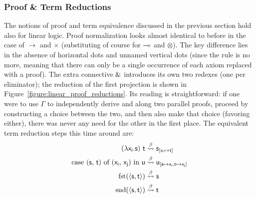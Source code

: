 \subsubsection{Proof \& Term Reductions}
The notions of proof and term equivalence discussed in the previous section hold also for linear logic.
Proof normalization looks almost identical to before in the case of $\to$ and $\times$ (substituting of course for $\li$ and $\otimes$).
The key difference lies in the absence of horizontal dots and unnamed vertical dots (since the \Contraction{} rule is no more, meaning that there can only be a single occurrence of each axiom replaced with a proof).
The extra connective ${\&}$ introduces its own two redexes (one per eliminator); the reduction of the first projection is shown in Figure~\ref{figure:linear_proof_reductions}. 
Its reading is straightforward: if one were to use $\Gamma$ to independently derive  and  along two parallel proofs, proceed by constructing a choice between the two, and then also make that choice (favoring either), there was never any need for the other in the first place.
The equivalent term reduction steps this time around are:
\begin{align*}
(\mathsf{\lambda x_i.s})~\mathsf{t} & \overset{\beta}{\leadsto} \mathsf{s}_{[\mathsf{x_i} \mapsto \mathsf{t}]}\\
\textrm{case (\ensuremath{\mathsf{s}}, \ensuremath{\mathsf{t}}) of (\ensuremath{\mathsf{x_i}}, \ensuremath{\mathsf{x_j}}) in \ensuremath{\mathsf{u}}} & \overset{\beta}{\leadsto} \mathsf{u_{[\mathsf{s} \mapsto \mathsf{x_i}, \mathsf{t} \mapsto \mathsf{x_j}]}}\\
\textrm{fst}(\langle\mathsf{s},\mathsf{t}\rangle) & \overset{\beta}{\leadsto} \mathsf{s}\\
\textrm{snd}(\langle\mathsf{s},\mathsf{t}\rangle) & \overset{\beta}{\leadsto} \mathsf{t}\\
\end{align*}


